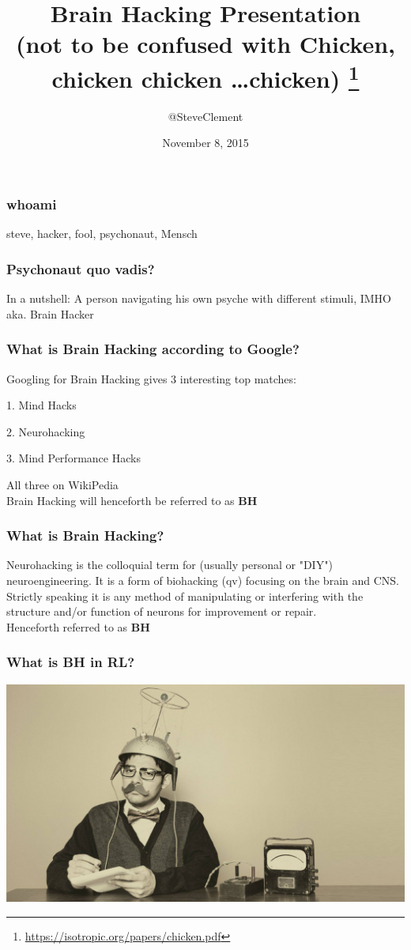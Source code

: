 \documentclass[a4paper]{beamer}
\title{Brain Hacking Presentation\\(not to be confused with Chicken, chicken chicken \ldots  chicken) \footnote{\url{https://isotropic.org/papers/chicken.pdf}}}
\author{@SteveClement}
\date{November 8, 2015}
\begin{document}
  
  {
    \frame{\titlepage}
  }

\begin{frame}
	\frametitle{whoami}
	steve, hacker, fool, psychonaut, Mensch
\end{frame}

\begin{frame}
	\frametitle{Psychonaut quo vadis?}
	In a nutshell: A person navigating his own psyche with different stimuli, IMHO aka. Brain Hacker
\end{frame}

\begin{frame}
	\frametitle{What is Brain Hacking according to Google?}

	Googling for Brain Hacking gives 3 interesting top matches:

	1. Mind Hacks

	2. Neurohacking

	3. Mind Performance Hacks

	All three on WikiPedia
	\\
	Brain Hacking will henceforth be referred to as {\bf BH}
\end{frame}

\begin{frame}
	\frametitle{What is Brain Hacking?}
	Neurohacking is the colloquial term for (usually personal or "DIY") neuroengineering. It is a form of biohacking (qv) focusing on the brain and CNS. Strictly speaking it is any method of manipulating or interfering with the structure and/or function of neurons for improvement or repair.
	\\
	Henceforth referred to as {\bf BH}
\end{frame}

\begin{frame}
	\frametitle{What is BH in RL?}
	\begin{center}
		\includegraphics[scale=0.17]{img/mindreader3.jpg}
	\end{center}
\end{frame}
\end{document}
